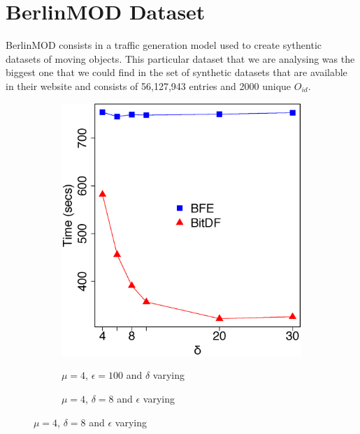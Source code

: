 {\section{BerlinMOD Dataset}
\label{sec:berlinmod}
BerlinMOD consists in a traffic generation model \citep{berlinmodpaper} used to create sythentic datasets of moving
objects. This particular dataset that we are analysing was the biggest one that we could find in the set of synthetic
datasets that are available in their website \citep{berlinmod} and consists of 56,127,943 entries and 2000 unique
$O_{id}$.

\begin{figure}[h!]
    \centering
    \caption{Results varying $\delta$ and $\epsilon$ for BerlinMOD dataset}
    \begin{subfigure}[t]{0.48\textwidth}
        \caption{$\mu = 4$, $\epsilon = 100$ and $\delta$ varying}
        \includegraphics[width=\textwidth]{images/BerlinMOD_n_4_g_100_varying_l.eps}
        \label{fig:berlinmod_vary_l}
    \end{subfigure}
    \begin{subfigure}[t]{0.48\textwidth}
        \caption{$\mu = 4$, $\delta = 8$ and $\epsilon$ varying}

\end{subfigure}
\end{figure}}
